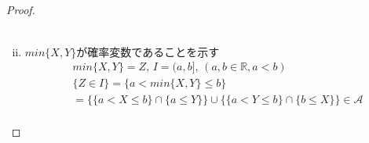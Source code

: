 \documentclass[dvipdfmx,10pt, a4j]{jarticle}
\theoremstyle{definition}
\begin{document}
\begin{proof}
\begin{enumerate}[i)]
\begin{align*}
            \end{align*}
            \item $min\{X, Y\}が確率変数であることを示す$\\
            \begin{align*}
                &min\{X, Y\} = Z, \, I=(a, b], \, (a, b \in \mathbb{R}, a < b)\\
                &\{Z \in I\} = \{a < min\{X, Y\} \leq b\}\\
                &=\{\{a < X \leq b\} \cap \{a \leq Y\}\} \cup \{\{a < Y \leq b\} \cap \{b \leq X\}\} \in \mathcal{A}\\
            \end{align*}
        \end{enumerate}
    \end{proof}
\end{document}
